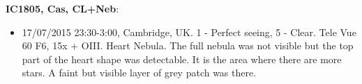 {\bf IC1805, Cas, CL+Neb}:
\begin{itemize}
\item 17/07/2015 23:30-3:00, Cambridge, UK. 1 - Perfect seeing, 5 - Clear. Tele Vue 60 F6, 15x + OIII. Heart Nebula. The full nebula was not visible but the top part of the heart shape was detectable. It is the area where there are more stars. A faint but visible layer of grey patch was there. 
\end{itemize}
